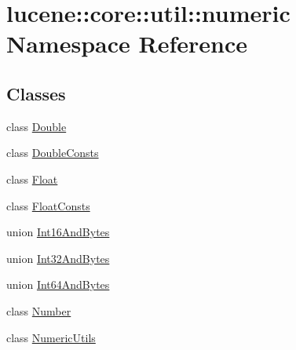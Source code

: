 \hypertarget{namespacelucene_1_1core_1_1util_1_1numeric}{}\section{lucene\+:\+:core\+:\+:util\+:\+:numeric Namespace Reference}
\label{namespacelucene_1_1core_1_1util_1_1numeric}
\subsection*{Classes}
\begin{DoxyCompactItemize}
\item 
class \mbox{\hyperlink{classlucene_1_1core_1_1util_1_1numeric_1_1Double}{Double}}
\item 
class \mbox{\hyperlink{classlucene_1_1core_1_1util_1_1numeric_1_1DoubleConsts}{Double\+Consts}}
\item 
class \mbox{\hyperlink{classlucene_1_1core_1_1util_1_1numeric_1_1Float}{Float}}
\item 
class \mbox{\hyperlink{classlucene_1_1core_1_1util_1_1numeric_1_1FloatConsts}{Float\+Consts}}
\item 
union \mbox{\hyperlink{unionlucene_1_1core_1_1util_1_1numeric_1_1Int16AndBytes}{Int16\+And\+Bytes}}
\item 
union \mbox{\hyperlink{unionlucene_1_1core_1_1util_1_1numeric_1_1Int32AndBytes}{Int32\+And\+Bytes}}
\item 
union \mbox{\hyperlink{unionlucene_1_1core_1_1util_1_1numeric_1_1Int64AndBytes}{Int64\+And\+Bytes}}
\item 
class \mbox{\hyperlink{classlucene_1_1core_1_1util_1_1numeric_1_1Number}{Number}}
\item 
class \mbox{\hyperlink{classlucene_1_1core_1_1util_1_1numeric_1_1NumericUtils}{Numeric\+Utils}}
\end{DoxyCompactItemize}
